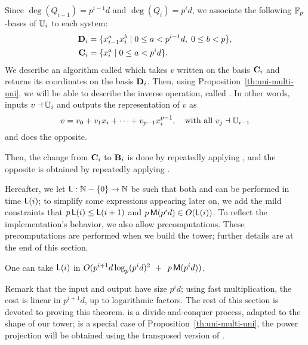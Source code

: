 Since $\deg(Q_{i-1})=p^{i-1}d$ and $\deg(Q_{i})=p^id$, we associate
the following $\mathbb{F}_p$-bases of $\mathbb{U}_i$ to each system:
\begin{align}
  \mathbf{D}_i &= \{x_{i-1}^ax_i^b \;|\; 0\le a<p^{i-1}d,\; 0\le b<p\}
  \text{,}\\
  \label{eq:bases}
 \mathbf{C}_i&=\{x_i^a \;|\; 0\le a<p^id\}
 \text{.}  
\end{align}
We describe an algorithm called \hyperref[alg:push-down]{} which takes $v$
written on the basis $\mathbf{C}_i$ and returns its coordinates on the
basis $\mathbf{D}_i$. Then, using Proposition~\ref{th:uni-multi-uni},
we will be able to describe the inverse operation, called
\hyperref[alg:liftup]{}.  In other words, \hyperref[alg:push-down]{} inputs $v\dashv\mathbb{U}_i$ and
outputs the representation of $v$ as
\begin{equation}
  \label{eq:vectorspace}
  v = v_0 + v_1x_i + \cdots + v_{p-1}x_i^{p-1}, \quad\text{with all~} v_j \dashv \mathbb{U}_{i-1}
\end{equation}
and \hyperref[alg:liftup]{} does the opposite.

Then, the change from $\mathbf{C}_i$ to $\mathbf{B}_i$ is done by
repeatedly applying \hyperref[alg:push-down]{}, and the opposite is obtained by
repeatedly applying \hyperref[alg:liftup]{}.

Hereafter, we let $\mathsf{L}:\mathbb{N}-\{0\} \to \mathbb{N}$ be such that both
\hyperref[alg:push-down]{} and \hyperref[alg:liftup]{} can be performed in time $\mathsf{L}(i)$; to
simplify some expressions appearing later on, we add the mild
constraints that $p\,\mathsf{L}(i) \le \mathsf{L}(i+1)$ and $p\,\mathsf{M}(p^{i}d)
\in O(\mathsf{L}(i))$.
To reflect the implementation's behavior, we also allow
precomputations. These precomputations are performed when we build
the tower; further details are at the end of this section.
\begin{theorem}\label{theo:L}
  One can take $\mathsf{L}(i)$ in $O( p^{i+1}d\log_p(p^id)^2 \ + \
\,p\,\mathsf{M}(p^{i}d))$.
\end{theorem}
Remark that the input and output have size $p^id$; using fast
multiplication, the cost is linear in $p^{i+1}d$, up to logarithmic
factors. The rest of this section is devoted to proving this theorem.
\hyperref[alg:push-down]{\alg{Push-down}} is a divide-and-conquer process, adapted to the shape
of our tower; \hyperref[alg:liftup]{\alg{Lift-up}} is a special case of
Proposition~\ref{th:uni-multi-uni}, the power projection will be
obtained using the transposed version of \hyperref[alg:push-down]{}.


